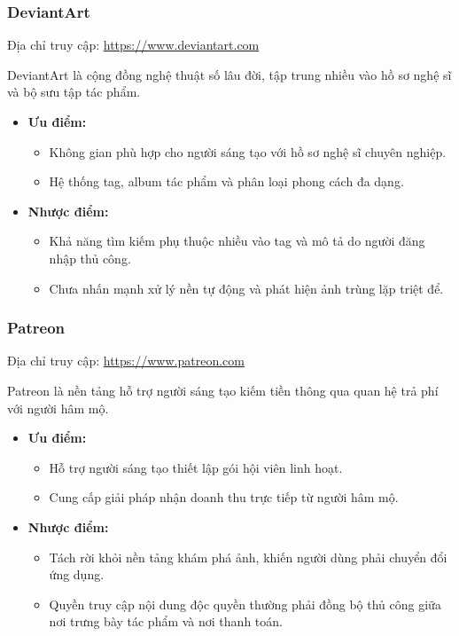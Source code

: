 \subsubsection*{DeviantArt}
Địa chỉ truy cập: \url{https://www.deviantart.com}

DeviantArt là cộng đồng nghệ thuật số lâu đời, tập trung nhiều vào hồ sơ nghệ sĩ và bộ sưu tập tác phẩm.
\begin{itemize}
  \item \textbf{Ưu điểm:}
  \begin{itemize}
    \item Không gian phù hợp cho người sáng tạo với hồ sơ nghệ sĩ chuyên nghiệp.
    \item Hệ thống tag, album tác phẩm và phân loại phong cách đa dạng.
  \end{itemize}
  \item \textbf{Nhược điểm:}
  \begin{itemize}
    \item Khả năng tìm kiếm phụ thuộc nhiều vào tag và mô tả do người đăng nhập thủ công.
    \item Chưa nhấn mạnh xử lý nền tự động và phát hiện ảnh trùng lặp triệt để.
  \end{itemize}
\end{itemize}

\subsubsection*{Patreon}
Địa chỉ truy cập: \url{https://www.patreon.com}

Patreon là nền tảng hỗ trợ người sáng tạo kiếm tiền thông qua quan hệ trả phí với người hâm mộ.
\begin{itemize}
  \item \textbf{Ưu điểm:}
  \begin{itemize}
    \item Hỗ trợ người sáng tạo thiết lập gói hội viên linh hoạt.
    \item Cung cấp giải pháp nhận doanh thu trực tiếp từ người hâm mộ.
  \end{itemize}
  \item \textbf{Nhược điểm:}
  \begin{itemize}
    \item Tách rời khỏi nền tảng khám phá ảnh, khiến người dùng phải chuyển đổi ứng dụng.
    \item Quyền truy cập nội dung độc quyền thường phải đồng bộ thủ công giữa nơi trưng bày tác phẩm và nơi thanh toán.
  \end{itemize}
\end{itemize}

